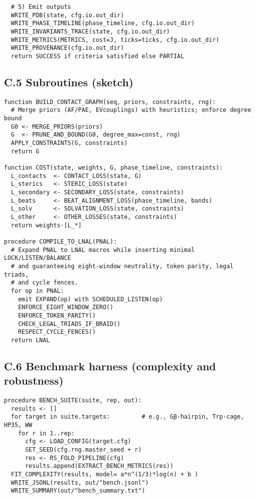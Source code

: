 \documentclass[12pt,a4paper]{article}
\begin{document}
\begin{verbatim}
  # 5) Emit outputs
  WRITE_PDB(state, cfg.io.out_dir)
  WRITE_PHASE_TIMELINE(phase_timeline, cfg.io.out_dir)
  WRITE_INVARIANTS_TRACE(state, cfg.io.out_dir)
  WRITE_METRICS(METRICS, cost=J, ticks=ticks, cfg.io.out_dir)
  WRITE_PROVENANCE(cfg.io.out_dir)
  return SUCCESS if criteria satisfied else PARTIAL
\end{verbatim}

\subsection*{C.5 Subroutines (sketch)}
\begin{verbatim}
function BUILD_CONTACT_GRAPH(seq, priors, constraints, rng):
  # Merge priors (AF/PAE, EVcouplings) with heuristics; enforce degree bound
  G0 <- MERGE_PRIORS(priors)
  G  <- PRUNE_AND_BOUND(G0, degree_max=const, rng)
  APPLY_CONSTRAINTS(G, constraints)
  return G

function COST(state, weights, G, phase_timeline, constraints):
  L_contacts  <- CONTACT_LOSS(state, G)
  L_sterics   <- STERIC_LOSS(state)
  L_secondary <- SECONDARY_LOSS(state, constraints)
  L_beats     <- BEAT_ALIGNMENT_LOSS(phase_timeline, bands)
  L_solv      <- SOLVATION_LOSS(state, constraints)
  L_other     <- OTHER_LOSSES(state, constraints)
  return weights·[L_*]

procedure COMPILE_TO_LNAL(PNAL):
  # Expand PNAL to LNAL macros while inserting minimal LOCK/LISTEN/BALANCE
  # and guaranteeing eight-window neutrality, token parity, legal triads,
  # and cycle fences.
  for op in PNAL:
    emit EXPAND(op) with SCHEDULED_LISTEN(op)
    ENFORCE_EIGHT_WINDOW_ZERO()
    ENFORCE_TOKEN_PARITY()
    CHECK_LEGAL_TRIADS_IF_BRAID()
    RESPECT_CYCLE_FENCES()
  return LNAL
\end{verbatim}

\subsection*{C.6 Benchmark harness (complexity and robustness)}
\begin{verbatim}
procedure BENCH_SUITE(suite, rep, out):
  results <- []
  for target in suite.targets:         # e.g., Gβ-hairpin, Trp-cage, HP35, WW
    for r in 1..rep:
      cfg <- LOAD_CONFIG(target.cfg)
      SET_SEED(cfg.rng.master_seed + r)
      res <- RS_FOLD_PIPELINE(cfg)
      results.append(EXTRACT_BENCH_METRICS(res))
  FIT_COMPLEXITY(results, model= a*n^(1/3)*log(n) + b )
  WRITE_JSONL(results, out/"bench.jsonl")
  WRITE_SUMMARY(out/"bench_summary.txt")
\end{verbatim}
\end{document}
